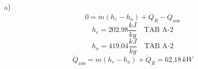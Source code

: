 a) 
\[
0 = \dot{m}(h_e - h_a) + \dot{Q}_R - \dot{Q}_{\text{aus}}
\]
\[
h_e = 202.98 \frac{kJ}{kg} \quad \text{TAB A-2}
\]
\[
h_a = 419.04 \frac{kJ}{kg} \quad \text{TAB A-2}
\]
\[
\dot{Q}_{\text{aus}} = \dot{m}(h_e - h_a) + \dot{Q}_R = 62.18 \, kW
\]
